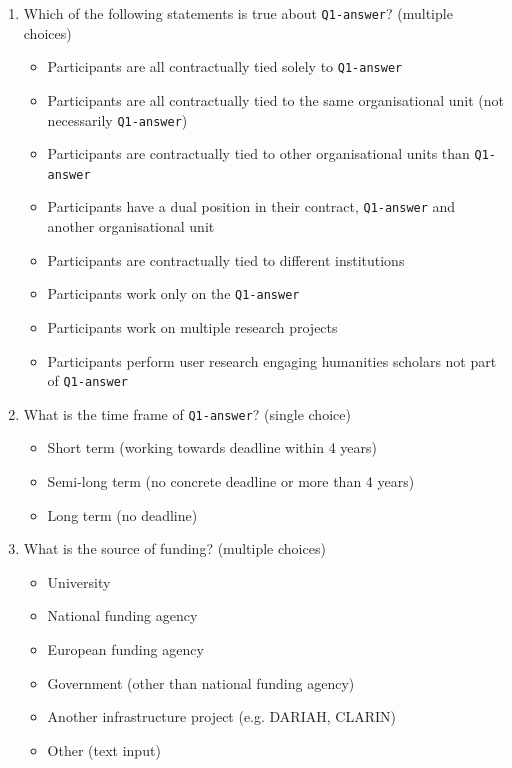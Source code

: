 \documentclass{article}
\begin{document}
\begin{enumerate}
\begin{itemize}
    \end{itemize}
    \item Which of the following statements is true about \texttt{Q1-answer}? (multiple choices)
    \begin{itemize}
        \item Participants are all contractually tied solely to \texttt{Q1-answer}
        \item Participants are all contractually tied to the same organisational unit (not necessarily \texttt{Q1-answer})
        \item Participants are contractually tied to other organisational units than \texttt{Q1-answer}
        \item Participants have a dual position in their contract, \texttt{Q1-answer} and another organisational unit
        \item Participants are contractually tied to different institutions
        \item Participants work only on the \texttt{Q1-answer}
        \item Participants work on multiple research projects
        \item Participants perform user research engaging humanities scholars not part of \texttt{Q1-answer}
    \end{itemize}
    \item What is the time frame of \texttt{Q1-answer}? (single choice)
    \begin{itemize}
        \item Short term (working towards deadline within 4 years)
        \item Semi-long term (no concrete deadline or more than 4 years)
        \item Long term (no deadline)
    \end{itemize}
    \item What is the source of funding? (multiple choices)
    \begin{itemize}
        \item University
        \item National funding agency
        \item European funding agency
        \item Government (other than national funding agency)
        \item Another infrastructure project (e.g. DARIAH, CLARIN)
        \item Other (text input)
    \end{itemize}

\end{enumerate}
\end{document}
